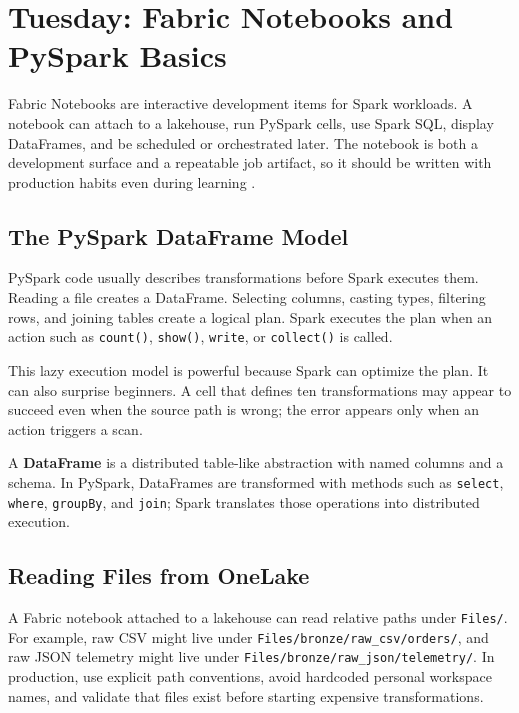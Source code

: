\section{Tuesday: Fabric Notebooks and PySpark Basics}
Fabric Notebooks are interactive development items for Spark workloads. A notebook can attach to a lakehouse, run PySpark cells, use Spark SQL, display DataFrames, and be scheduled or orchestrated later. The notebook is both a development surface and a repeatable job artifact, so it should be written with production habits even during learning \cite{microsoftFabricNotebooks}.

\subsection{The PySpark DataFrame Model}
PySpark code usually describes transformations before Spark executes them. Reading a file creates a DataFrame. Selecting columns, casting types, filtering rows, and joining tables create a logical plan. Spark executes the plan when an action such as \texttt{count()}, \texttt{show()}, \texttt{write}, or \texttt{collect()} is called.

This lazy execution model is powerful because Spark can optimize the plan. It can also surprise beginners. A cell that defines ten transformations may appear to succeed even when the source path is wrong; the error appears only when an action triggers a scan.

\begin{definitionbox}
A \textbf{DataFrame} is a distributed table-like abstraction with named columns and a schema. In PySpark, DataFrames are transformed with methods such as \texttt{select}, \texttt{where}, \texttt{groupBy}, and \texttt{join}; Spark translates those operations into distributed execution.
\end{definitionbox}

\subsection{Reading Files from OneLake}
A Fabric notebook attached to a lakehouse can read relative paths under \texttt{Files/}. For example, raw CSV might live under \texttt{Files/bronze/raw\_csv/orders/}, and raw JSON telemetry might live under \texttt{Files/bronze/raw\_json/telemetry/}. In production, use explicit path conventions, avoid hardcoded personal workspace names, and validate that files exist before starting expensive transformations.

